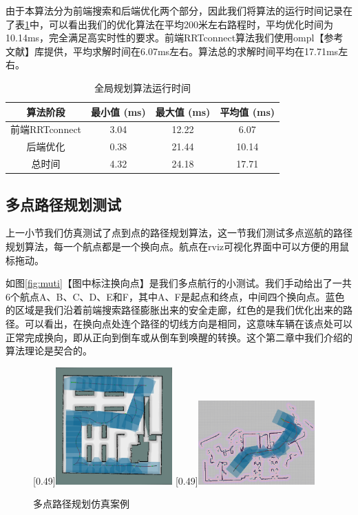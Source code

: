 \documentclass[master,academic]{ysuthesis} %
\begin{document}
		由于本算法分为前端搜索和后端优化两个部分，因此我们将算法的运行时间记录在了表\ref{tab:global_planning_time}中，可以看出我们的优化算法在平均200米左右路程时，平均优化时间为10.14ms，完全满足高实时性的要求。前端RRTconnect算法我们使用ompl【参考文献】库提供，平均求解时间在6.07ms左右。算法总的求解时间平均在17.71ms左右。
		
		\begin{table}[!ht]
			\caption{全局规划算法运行时间}
			\label{tab:global_planning_time}
			\centering
			\begin{tabular}{cccc}
				\toprule
				算法阶段   & 最小值 (ms) & 最大值 (ms) & 平均值 (ms) \\
				\midrule
				前端RRTconnect & 3.04    & 12.22   & 6.07       \\
				后端优化       & 0.38    & 21.44    & 10.14      \\
				总时间         & 4.32    & 24.18    & 17.71      \\
				\bottomrule
			\end{tabular}
		\end{table}

		\subsection{多点路径规划测试}
		上一小节我们仿真测试了点到点的路径规划算法，这一节我们测试多点巡航的路径规划算法，每一个航点都是一个换向点。航点在rviz可视化界面中可以方便的用鼠标拖动。

		如图\ref{fig:muti}【图中标注换向点】是我们多点航行的小测试。我们手动给出了一共6个航点A、B、C、D、E和F，其中A、F是起点和终点，中间四个换向点。蓝色的区域是我们沿着前端搜索路径膨胀出来的安全走廊，红色的是我们优化出来的路径。可以看出，在换向点处连个路径的切线方向是相同，这意味车辆在该点处可以正常完成换向，即从正向到倒车或从倒车到唤醒的转换。这个第二章中我们介绍的算法理论是契合的。
		\begin{figure}[!ht]
			\centering
			[0.49\textwidth]{\includegraphics[width=0.4\textwidth]{muti.png}}
			[0.49\textwidth]{\includegraphics[width=0.4\textwidth]{dataminco.png}}
			\caption{多点路径规划仿真案例}
			\label{fig:多点路径规划仿真案例}
		\end{figure}
\end{document}
